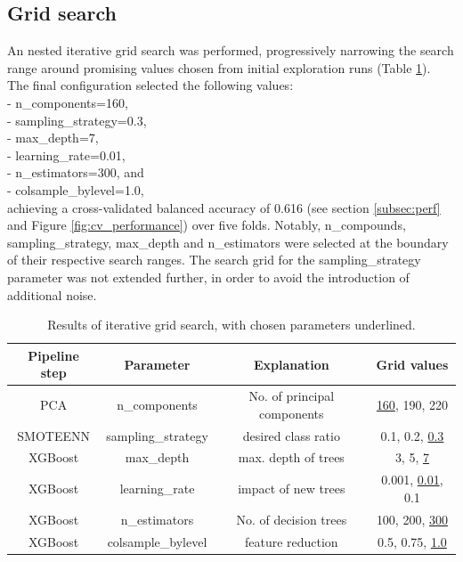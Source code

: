 \documentclass[hidelinks,11pt]{article}
\begin{document}
\subsection{Grid search} \label{subsec:grid}
An nested iterative grid search was performed, progressively narrowing the search range around promising values chosen
from initial exploration runs (Table \ref{tab:grid}). 
The final configuration selected the following values: \\
- n\_components=160, \\
- sampling\_strategy=0.3, \\
- max\_depth=7, \\
- learning\_rate=0.01, \\
- n\_estimators=300, and \\
- colsample\_bylevel=1.0, \\
achieving a cross-validated 
balanced accuracy of 0.616 (see section \ref{subsec:perf} and Figure \ref{fig:cv_performance}) over five folds. 
Notably, n\_compounds, sampling\_strategy, max\_depth and n\_estimators were selected at the boundary of their respective 
search ranges.
The search grid for the sampling\_strategy parameter was not extended further,
in order to avoid the introduction of additional noise.

\begin{table}[ht]
    \centering
    \begin{tabular}{ c  c  c  c }
        \hline
        Pipeline step & Parameter & Explanation & Grid values \\
        \hline
        \hline
        PCA &  n\_components & No. of principal components & \underline{160}, 190, 220 \\
        \hline
        SMOTEENN & sampling\_strategy & desired class ratio & 0.1, 0.2, \underline{0.3} \\
        \hline
        XGBoost & max\_depth & max. depth of trees & 3, 5, \underline{7} \\
        XGBoost & learning\_rate & impact of new trees & 0.001, \underline{0.01}, 0.1 \\
        XGBoost & n\_estimators & No. of decision trees & 100, 200, \underline{300} \\
        XGBoost & colsample\_bylevel & feature reduction & 0.5, 0.75, \underline{1.0} \\
        \hline
    \end{tabular}
    \caption{Results of iterative grid search, with chosen parameters underlined.}
    \label{tab:grid}
\end{table}
\end{document}
